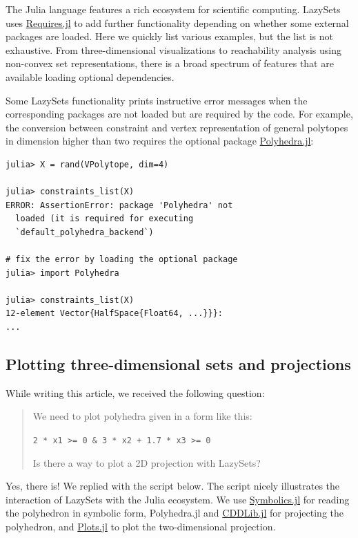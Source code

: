 The Julia language features a rich ecosystem for scientific computing.
%
LazySets uses \href{https://github.com/JuliaPackaging/Requires.jl}{Requires.jl} to add further functionality depending on whether some external packages are loaded.
%
Here we quickly list various examples, but the list is not exhaustive.
%
From three-dimensional visualizations to reachability analysis using non-convex set representations, there is a broad spectrum of features that are available loading optional dependencies.

\smallskip

Some LazySets functionality prints instructive error messages when the corresponding packages are not loaded but are required by the code. For example, the conversion between constraint and vertex representation of general polytopes in dimension higher than two requires the optional package \href{https://github.com/JuliaPolyhedra/Polyhedra.jl}{Polyhedra.jl}:

\begin{minipage}{\linewidth}
\begin{lstlisting}
julia> X = rand(VPolytope, dim=4)
	
julia> constraints_list(X)
ERROR: AssertionError: package 'Polyhedra' not
  loaded (it is required for executing
  `default_polyhedra_backend`)

# fix the error by loading the optional package
julia> import Polyhedra

julia> constraints_list(X)
12-element Vector{HalfSpace{Float64, ...}}}:
...
	\end{lstlisting}
\end{minipage}


\subsection{Plotting three-dimensional sets and projections}

While writing this article, we received the following question:

\begin{quote}
We need to plot polyhedra given in a form like this:

\begin{center}
	\texttt{2 * x1 >= 0 \& 3 * x2 + 1.7 * x3 >= 0}
\end{center}

Is there a way to plot a 2D projection with LazySets?
\end{quote}

Yes, there is!
We replied with the script below.
The script nicely illustrates the interaction of LazySets with the Julia ecosystem.
We use \href{https://github.com/JuliaSymbolics/Symbolics.jl}{Symbolics.jl} for reading the polyhedron in symbolic form, Polyhedra.jl and \href{https://github.com/JuliaPolyhedra/CDDLib.jl}{CDDLib.jl} for projecting the polyhedron, and \href{https://github.com/JuliaPlots/Plots.jl}{Plots.jl} to plot the two-dimensional projection.

